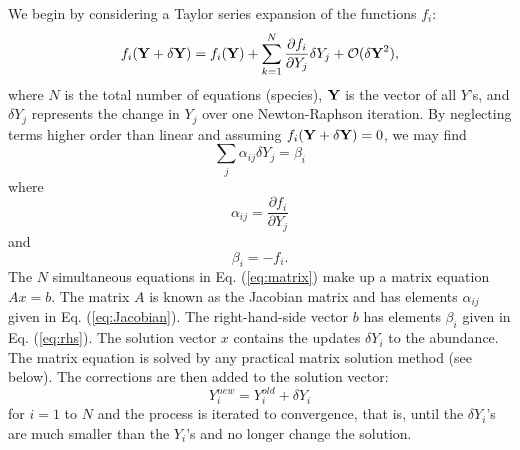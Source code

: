\documentclass{article}    %
\begin{document}
We begin by considering a Taylor series expansion of the functions
$f_i$:
\begin{equation}
f_i ( {\bf Y} + \delta{\bf Y } ) = f_i ( {\bf Y} )
+ \sum_{k=1}^N \frac{\partial f_i}{\partial Y_j}
\delta Y_j + {\cal O}({\bf \delta Y}^2),
\end{equation}
where $N$ is the total number of equations (species), ${\bf Y}$
is the vector of all $Y$'s, and $\delta Y_j$
represents the change in $Y_j$ over one Newton-Raphson
iteration.  By neglecting terms higher order than linear and
assuming $f_i ( {\bf Y} + \delta{\bf Y} ) = 0$, we
may find
\begin{equation}
\sum_j \alpha_{ij} \delta Y_j = \beta_i  \label{eq:matrix}
\end{equation}
where
\begin{equation}
\alpha_{ij} = \frac{\partial f_i}{\partial Y_j}
\label{eq:Jacobian}
\end{equation}
and
\begin{equation}
\beta_i = -f_i.  \label{eq:rhs}
\end{equation}
The $N$ simultaneous equations in Eq. (\ref{eq:matrix}) make up a
matrix equation $A x = b$.  The matrix $A$ is known as the Jacobian matrix
and has elements $\alpha_{ij}$ given in Eq. (\ref{eq:Jacobian}).  The
right-hand-side vector $b$ has elements $\beta_i$ given in Eq. (\ref{eq:rhs}).
The solution vector $x$ contains the updates $\delta Y_i$
to the abundance.
The matrix equation is solved by
any practical matrix solution method (see below). The corrections
are then added to the solution vector:
\begin{equation}
Y_i^{new} = Y_i^{old} + \delta Y_i
\label{eq:correction}
\end{equation}
for $i = 1$ to $N$ and the process is iterated to convergence, that is, until
the $\delta Y_i$'s are much smaller than the $Y_i$'s and no longer change
the solution.
\end{document}
